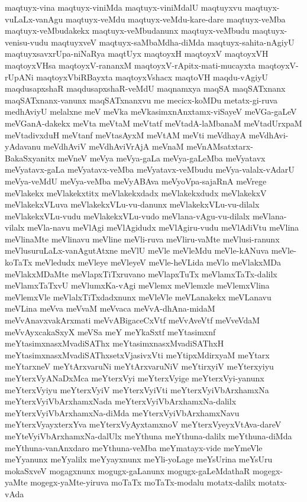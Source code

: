 {maqtuyx-vina
maqtuyx-viniMda
maqtuyx-viniMdalU
maqtuyxvu
maqtuyx-vuLaLx-vanAgu
maqtuyx-veMdu
maqtuyx-veMdu-kare-dare
maqtuyx-veMba
maqtuyx-veMbudakekx
maqtuyx-veMbudanunx
maqtuyx-veMbudu
maqtuyx-venisu-vudu
maqtuyxveV
maqtuyx-saMbaMdha-diMda
maqtuyx-sahita-nAgiyU
maqtuyxsavxrUpa-niNaRya
maqtUyx
maqtoyxH
maqtoyxV
maqtoyxVH
maqtoyxVHsa
maqtoyxV-rananxM
maqtoyxV-rApitx-mati-mucayxta
maqtoyxV-rUpANi
maqtoyxVbiRBayxta
maqtoyxVshacx
maqtoVH
maqdu-vAgiyU
maqdusapxshaR
maqdusapxshaR-veMdU
maqnamxya
maqSA
maqSATxnanx
maqSATxnanx-vanunx
maqSATxnanxvu
me
mecicx-koMDu
metatx-gi-ruva
medhAviyU
melalxne
meV
meVka
meVkasimxnAnxtamx-viSayeV
meVGa-gaLeV
meVGanA-dakekx
meVta
meVtaM
meVtatf
meVtadA-laMbanaM
meVtadUrxpaM
meVtadivxduH
meVtanf
meVtasAyxM
meVtAM
meVti
meVdhayA
meVdhAvi-yAdavanu
meVdhAviV
meVdhAviVrAjA
meVnaM
meVnAMsatxtarx-BakaSxyanitx
meVneV
meVya
meVya-gaLa
meVya-gaLeMba
meVyatavx
meVyatavx-gaLa
meVyatavx-veMba
meVyatavx-veMbudu
meVya-valalx-vAdarU
meVya-veMdU
meVya-veMba
meVyABAva
meVyoVpa-sajaRnA
meVrege
meVlakekx
meVlakekxtitx
meVlakekxdadx
meVlakekxdudx
meVlakekxV
meVlakekxVLuva
meVlakekxVLu-vu-danunx
meVlakekxVLu-vu-dilalx
meVlakekxVLu-vudu
meVlakekxVLu-vudo
meVlana-vAgu-vu-dilalx
meVlana-vilalx
meVla-navu
meVlAgi
meVlAgidudx
meVlAgiru-vudu
meVlAdiVtu
meVlina
meVlinaMte
meVlinavu
meVline
meVli-ruva
meVliru-vaMte
meVlusi-ranunx
meVlusuruLaLx-vanAgutAtxne
meVlU
meVle
meVleMdu
meVle-kANuva
meVle-koTaTx
meVledudx
meVleye
meVleyeV
meVle-heVLida
meVlo
meVlakxMDa
meVlakxMDaMte
meVlapxTiTxruvano
meVlapxTuTx
meVlamxTaTx-dalilx
meVlamxTaTxvU
meVlumxKa-vAgi
meVlemx
meVlemxle
meVlemxVlina
meVlemxVle
meVlalxTiTxdadxnunx
meVleVle
meVLanakekx
meVLanavu
meVLina
meVva
meVvaM
meVvaca
meVvA-dhAna-midaM
meVvAnavxvakArxmati
meVvABigaceCxVtf
meVvAveVtf
meVveVdaM
meVvAyxcakaSxyX
meVSa
meY
meYkaSxtf
meYtasimxnf
meYtasimxnasxMvadiSAThx
meYtasimxnasxMvadiSAThxH
meYtasimxnasxMvadiSAThxsetxVjasivxVti
meYtipxMdirxyaM
meYtarx
meYtarxneV
meYtArxvaruNi
meYtArxvaruNiV
meYtirxyiV
meYterxyiyu
meYterxVyANaDxMca
meYterxVyi
meYterxVyige
meYterxVyi-yanunx
meYterxVyiyu
meYterxVyiV
meYterxVyiVti
meYterxVyiVbArxhamxNa
meYterxVyiVbArxhamxNada
meYterxVyiVbArxhamxNa-dalilx
meYterxVyiVbArxhamxNa-diMda
meYterxVyiVbArxhamxNavu
meYterxVyayxterxYva
meYterxVyAyxtamxnoV
meYterxVyeyxVtAva-dareV
meYteVyiVbArxhamxNa-dalUlx
meYthuna
meYthuna-dalilx
meYthuna-diMda
meYthuna-vanAnxdaro
meYthuna-veMba
meYmatayx-vide
meYmeVle
meYyanunx
meYyalilx
meYyayxnunx
meYli-yoLage
meYsUrina
meYsUru
mokaSxveV
mogagxnunx
mogugx-gaLanunx
mogugx-gaLeMdathaR
mogegx-yaMte
mogegx-yaMte-yiruva
moTaTx
moTaTx-modalu
motatx-dalilx
motatx-vAda
}
